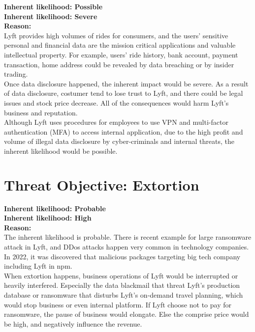 \documentclass[11pt]{article}
\begin{document}
\begin{boxB}
    \textbf{Inherent likelihood: Possible}\\
    \textbf{Inherent likelihood: Severe}\\
    
    \textbf{Reason: }
    \\
    
    Lyft provides high volumes of rides for consumers, and the users' sensitive personal and financial data are the mission critical applications and valuable intellectual property. For example, users' ride history, bank account, payment transaction, home address could be revealed by data breaching or by insider trading.\\
    
    Once data disclosure happened, the inherent impact would be severe. As a result of data disclosure, costumer tend to lose trust to Lyft, and there could be legal issues and stock price decrease. All of the consequences would harm Lyft's business and reputation.\\

    Although Lyft uses procedures for employees to use VPN and multi-factor authentication (MFA) to access internal application\cite{lyft1}, due to the high profit and volume of illegal data disclosure by cyber-criminals and internal threats, the inherent likelihood would be possible.


\end{boxB}


\section{Threat Objective: Extortion}




\begin{boxB}
    

    \textbf{Inherent likelihood: Probable}\\
    \textbf{Inherent likelihood: High}\\
    
    \textbf{Reason: }\\

    The inherent likelihood is probable. There is recent example for large ransomware attack in Lyft, and DDos attacks happen very common in technology companies. In 2022, it was discovered that malicious packages targeting big tech company including Lyft in npm.\\

    When extortion happens, business operations of Lyft would be interrupted or heavily interfered. Especially the data blackmail that threat Lyft's production database or ransomware that disturbs Lyft's on-demand travel planning, which would stop business or even internal platform. If Lyft choose not to pay for ransomware, the pause of business would elongate. Else the comprise price would be high, and negatively influence the revenue.

\end{boxB}
\end{document}
